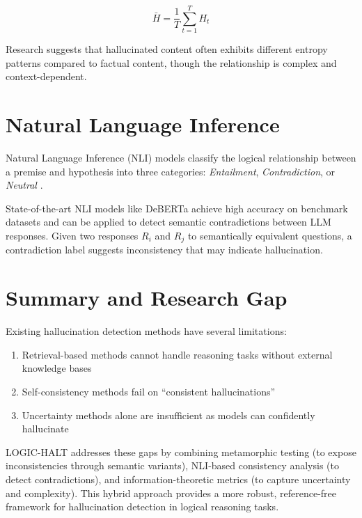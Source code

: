 \begin{equation}
    \bar{H} = \frac{1}{T} \sum_{t=1}^{T} H_t
\end{equation}

Research suggests that hallucinated content often exhibits different entropy patterns compared to factual content, though the relationship is complex and context-dependent.

\section{Natural Language Inference}

Natural Language Inference (NLI) models classify the logical relationship between a premise and hypothesis into three categories: \textit{Entailment}, \textit{Contradiction}, or \textit{Neutral} \cite{bowman2015large}.

State-of-the-art NLI models like DeBERTa \cite{he2021deberta} achieve high accuracy on benchmark datasets and can be applied to detect semantic contradictions between LLM responses. Given two responses $R_i$ and $R_j$ to semantically equivalent questions, a contradiction label suggests inconsistency that may indicate hallucination.

\section{Summary and Research Gap}

Existing hallucination detection methods have several limitations:

\begin{enumerate}
    \item Retrieval-based methods cannot handle reasoning tasks without external knowledge bases
    \item Self-consistency methods fail on ``consistent hallucinations''
    \item Uncertainty methods alone are insufficient as models can confidently hallucinate
\end{enumerate}

LOGIC-HALT addresses these gaps by combining metamorphic testing (to expose inconsistencies through semantic variants), NLI-based consistency analysis (to detect contradictions), and information-theoretic metrics (to capture uncertainty and complexity). This hybrid approach provides a more robust, reference-free framework for hallucination detection in logical reasoning tasks.

